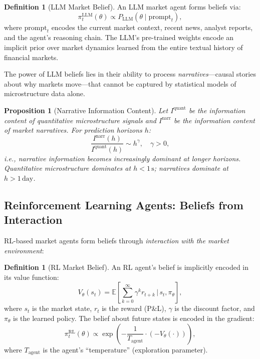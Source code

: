 \documentclass[12pt,a4paper]{article}
\newtheorem{proposition}[theorem]{Proposition}
\theoremstyle{definition}
\newtheorem{definition}[theorem]{Definition}
\newcommand{\E}{\mathbb{E}}
\begin{document}
\begin{definition}[LLM Market Belief]\label{def:llm-belief}
An LLM market agent forms beliefs via:
\begin{equation}\label{eq:llm-belief}
  \pi_t^{\mathrm{LLM}}(\theta) \propto P_{\mathrm{LLM}}(\theta \mid \text{prompt}_t),
\end{equation}
where $\text{prompt}_t$ encodes the current market context, recent news, analyst reports, and the agent's reasoning chain. The LLM's pre-trained weights encode an implicit prior over market dynamics learned from the entire textual history of financial markets.
\end{definition}

The power of LLM beliefs lies in their ability to process \emph{narratives}---causal stories about why markets move---that cannot be captured by statistical models of microstructure data alone.

\begin{proposition}[Narrative Information Content]\label{prop:narrative}
Let $I^{\mathrm{quant}}$ be the information content of quantitative microstructure signals and $I^{\mathrm{narr}}$ be the information content of market narratives. For prediction horizons $h$:
\begin{equation}
  \frac{I^{\mathrm{narr}}(h)}{I^{\mathrm{quant}}(h)} \sim h^{\gamma}, \quad \gamma > 0,
\end{equation}
i.e., narrative information becomes increasingly dominant at longer horizons. Quantitative microstructure dominates at $h < 1\,\mathrm{s}$; narratives dominate at $h > 1\,\mathrm{day}$.
\end{proposition}

\subsection{Reinforcement Learning Agents: Beliefs from Interaction}

RL-based market agents form beliefs through \emph{interaction with the market environment}:

\begin{definition}[RL Market Belief]\label{def:rl-belief}
An RL agent's belief is implicitly encoded in its value function:
\begin{equation}
  V_\theta(s_t) = \E\left[\sum_{k=0}^\infty \gamma^k r_{t+k} \,\bigg|\, s_t, \pi_\theta\right],
\end{equation}
where $s_t$ is the market state, $r_t$ is the reward (P\&L), $\gamma$ is the discount factor, and $\pi_\theta$ is the learned policy. The belief about future states is encoded in the gradient:
\begin{equation}
  \pi_t^{\mathrm{RL}}(\theta) \propto \exp\left(-\frac{1}{T_{\mathrm{agent}}} \cdot (-V_\theta(\cdot))\right),
\end{equation}
where $T_{\mathrm{agent}}$ is the agent's ``temperature'' (exploration parameter).
\end{definition}
\end{document}
